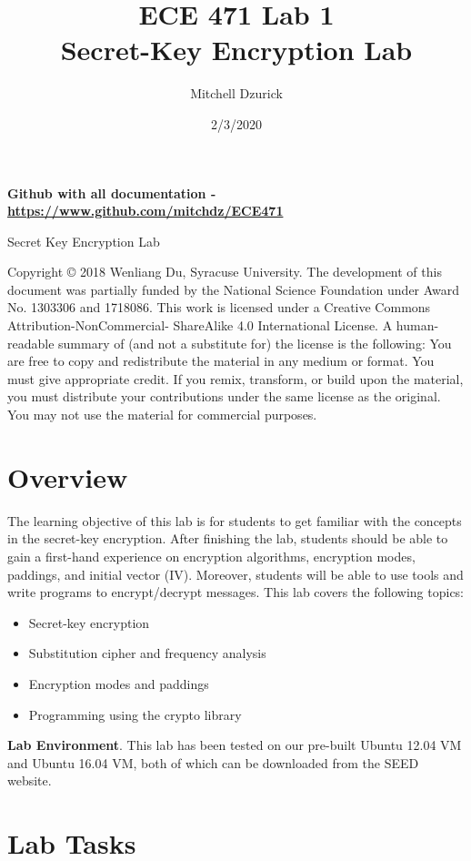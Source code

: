 \documentclass[12pt]{article}
\title {{\bf ECE 471 Lab 1} \\
\large{Secret-Key Encryption Lab}}
\author{Mitchell Dzurick}
\date{2/3/2020}
\begin{document}
\maketitle
\textbf{Github with all documentation - \url{https://www.github.com/mitchdz/ECE471}}
\tableofcontents 

\clearpage


Secret Key Encryption Lab

Copyright © 2018 Wenliang Du, Syracuse University. The development of this document was partially funded by the National Science Foundation under Award No. 1303306 and 1718086. This work is licensed under a Creative Commons Attribution-NonCommercial- ShareAlike 4.0 International License. A human-readable summary of (and not a substitute for) the license is the following: You are free to copy and redistribute the material in any medium or format. You must give appropriate credit. If you remix, transform, or build upon the material, you must distribute your contributions under the same license as the original. You may not use the material for commercial purposes.

\section{Overview}

The learning objective of this lab is for students to get familiar with the concepts in the secret-key encryption. After finishing the lab, students should be able to gain a first-hand experience on encryption algorithms, encryption modes, paddings, and initial vector (IV). Moreover, students will be able to use tools and write programs to encrypt/decrypt messages. This lab covers the following topics:

    \begin{itemize}
        \item Secret-key encryption
        \item Substitution cipher and frequency analysis
        \item Encryption modes and paddings
        \item Programming using the crypto library
    \end{itemize}

\textbf{Lab Environment}. This lab has been tested on our pre-built Ubuntu 12.04 VM and Ubuntu 16.04 VM, both of which can be downloaded from the SEED website.

\clearpage

\section{Lab Tasks}
\end{document}
